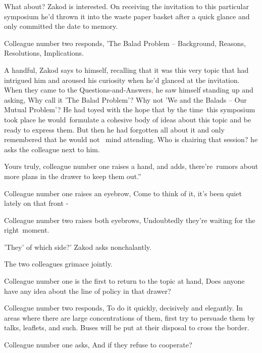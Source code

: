 \documentclass[letterpaper]{article}
\begin{document}
{\textquotedbl}What about?{\textquotedbl} Zakod is interested. On receiving the invitation to this particular symposium
he'd thrown it into the waste paper basket after a quick glance and only committed the date to memory. 

Colleague number two responds, {\textquotedbl}'The Balad Problem -- Background, Reasons, Resolutions,
Implications.{\textquotedbl} 

A handful, Zakod says to himself, recalling that it was this very topic that had intrigued him and aroused his curiosity
when he'd glanced at the invitation. When they\textcolor{red}{ }came\textcolor[rgb]{0.0,0.4392157,0.7529412}{ }to the
Questions-and-Answers\textcolor{red}{, }he saw himself standing up and asking, {\textquotedbl}Why call it 'The Balad
Problem'? Why not 'We and the Balads -- Our Mutual Problem'?{\textquotedbl} He had toyed with the hope that by the
time~this symposium\textcolor{red}{ }took place he would~formulate a cohesive body of ideas about this topic and be
ready to express them. But then he had forgotten all about it and only remembered that he would not \ mind attending.
{\textquotedbl}Who is chairing that session?{\textquotedbl} he asks the colleague next to him. 

{\textquotedbl}Yours truly,{\textquotedbl} colleague number one raises a hand, and adds, {\textquotedbl}there're~rumors
about more plans in the drawer to keep them out.''

Colleague number one raises an eyebrow, {\textquotedbl}Come to think of it, it's been quiet lately on that front
-{\textquotedbl} 

Colleague number two raises both eyebrows, {\textquotedbl}Undoubtedly they're waiting for the
right~moment.{\textquotedbl} 

{\textquotedbl}'They' of which side?{\textquotedbl}' Zakod asks nonchalantly.

The two colleagues grimace jointly. 

Colleague number one is the first to return to the topic at hand, {\textquotedbl}Does anyone have any idea about the
line of policy in that drawer?{\textquotedbl} 

Colleague number two responds, {\textquotedbl}To do it quickly, decisively and elegantly. In areas where there are large
concentrations of them, first try to persuade them by talks, leaflets, and such. Buses will be put at their disposal to
cross the border.{\textquotedbl} 

Colleague number one asks, {\textquotedbl}And if they refuse to cooperate?{\textquotedbl} 
\end{document}
